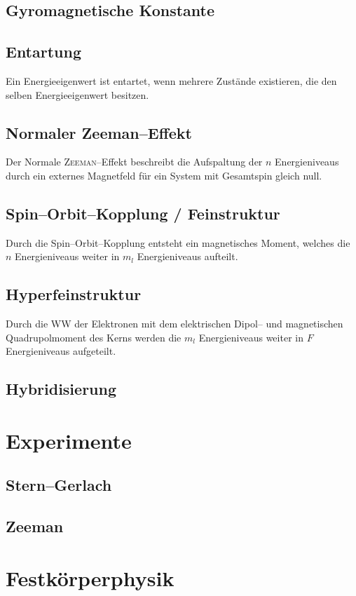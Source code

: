 \documentclass[a4paper,12pt]{article}
\numberwithin{equation}{section}
\begin{document}
\subsection{Gyromagnetische Konstante}
\subsection{Entartung}
Ein Energieeigenwert ist entartet, wenn mehrere Zustände existieren, die den selben Energieeigenwert besitzen.

\subsection{Normaler Zeeman--Effekt}
Der Normale \textsc{Zeeman}--Effekt beschreibt die Aufspaltung der $n$ Energieniveaus durch ein externes Magnetfeld für ein System mit Gesamtspin gleich null.

\subsection{Spin--Orbit--Kopplung / Feinstruktur}
Durch die Spin--Orbit--Kopplung entsteht ein magnetisches Moment, welches die $n$ Energieniveaus weiter in $m_l$ Energieniveaus aufteilt.

\subsection{Hyperfeinstruktur}
Durch die WW der Elektronen mit dem elektrischen Dipol-- und magnetischen Quadrupolmoment des Kerns werden die $m_l$ Energieniveaus weiter in $F$ Energieniveaus aufgeteilt.

\subsection{Hybridisierung}

\newpage
\section{Experimente}
\subsection{Stern--Gerlach}
\subsection{Zeeman}

\newpage
\section{Festkörperphysik}
\end{document}
